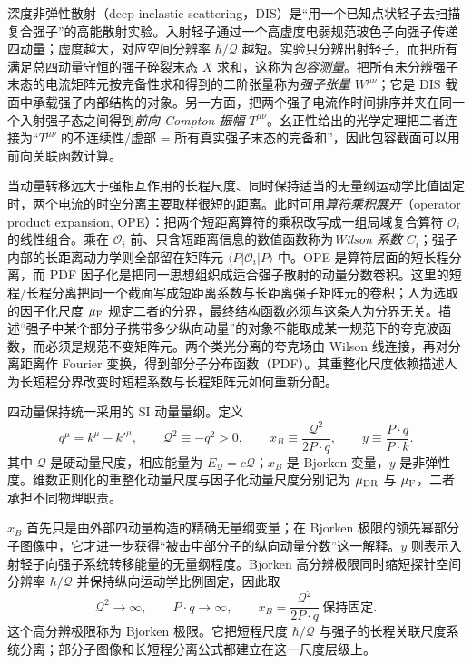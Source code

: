 
深度非弹性散射（deep-inelastic scattering，DIS）是“用一个已知点状轻子去扫描复合强子”的高能散射实验。入射轻子通过一个高虚度电弱规范玻色子向强子传递四动量；虚度越大，对应空间分辨率 $\hbar/\mathcal Q$ 越短。实验只分辨出射轻子，而把所有满足总四动量守恒的强子碎裂末态 $X$ 求和，这称为\emph{包容测量}。把所有未分辨强子末态的电流矩阵元按完备性求和得到的二阶张量称为\emph{强子张量} $W^{\mu\nu}$；它是 DIS 截面中承载强子内部结构的对象。另一方面，把两个强子电流作时间排序并夹在同一个入射强子态之间得到\emph{前向 Compton 振幅} $T^{\mu\nu}$。幺正性给出的光学定理把二者连接为“$T^{\mu\nu}$ 的不连续性/虚部 = 所有真实强子末态的完备和”，因此包容截面可以用前向关联函数计算。

当动量转移远大于强相互作用的长程尺度、同时保持适当的无量纲运动学比值固定时，两个电流的时空分离主要取样很短的距离。此时可用\emph{算符乘积展开}（operator product expansion, OPE）：把两个短距离算符的乘积改写成一组局域复合算符 $\mathcal O_i$ 的线性组合。乘在 $\mathcal O_i$ 前、只含短距离信息的数值函数称为\emph{Wilson 系数} $C_i$；强子内部的长距离动力学则全部留在矩阵元 $\langle P|\mathcal O_i|P\rangle$ 中。OPE 是算符层面的短长程分离，而 PDF 因子化是把同一思想组织成适合强子散射的动量分数卷积。这里的短程/长程分离把同一个截面写成短距离系数与长距离强子矩阵元的卷积；人为选取的因子化尺度 $\mu_{\rm F}$ 规定二者的分界，最终结构函数必须与这条人为分界无关。描述“强子中某个部分子携带多少纵向动量”的对象不能取成某一规范下的夸克波函数，而必须是规范不变矩阵元。两个类光分离的夸克场由 Wilson 线连接，再对分离距离作 Fourier 变换，得到部分子分布函数（PDF）。其重整化尺度依赖描述人为长短程分界改变时短程系数与长程矩阵元如何重新分配。

四动量保持统一采用的 SI 动量量纲。定义
\begin{equation}
 \boxed{
 q^\mu=k^\mu-k'^\mu,
 \qquad
 \mathcal Q^2\equiv-q^2>0,
 \qquad
 x_B\equiv\frac{\mathcal Q^2}{2P\cdot q},
 \qquad
 y\equiv\frac{P\cdot q}{P\cdot k}.}
 \label{eq:dis-kinematic-invariants-dp68}
\end{equation}
其中 $\mathcal Q$ 是硬动量尺度，相应能量为 $E_{\mathcal Q}=c\mathcal Q$；$x_B$ 是 Bjorken 变量，$y$ 是非弹性度。维数正则化的重整化动量尺度与因子化动量尺度分别记为 $\mu_{\rm DR}$ 与 $\mu_{\rm F}$，二者承担不同物理职责。

$x_B$ 首先只是由外部四动量构造的精确无量纲变量；在 Bjorken 极限的领先幂部分子图像中，它才进一步获得“被击中部分子的纵向动量分数”这一解释。$y$ 则表示入射轻子向强子系统转移能量的无量纲程度。Bjorken 高分辨极限同时缩短探针空间分辨率 $\hbar/\mathcal Q$ 并保持纵向运动学比例固定，因此取
\begin{equation}
 \boxed{
 \mathcal Q^2\to\infty,
 \qquad P\cdot q\to\infty,
 \qquad x_B=\frac{\mathcal Q^2}{2P\cdot q}\ \text{保持固定}.}
 \label{eq:dis-bjorken-limit-dp76}
\end{equation}
这个高分辨极限称为 Bjorken 极限。它把短程尺度 $\hbar/\mathcal Q$ 与强子的长程关联尺度系统分离；部分子图像和长短程分离公式都建立在这一尺度层级上。

